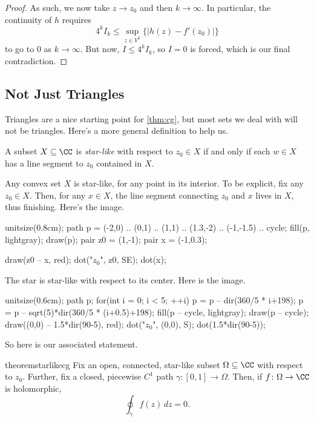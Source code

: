 \documentclass[../notes.tex]{subfiles}
\begin{document}
\begin{proof}
	As such, we now take $z\to z_0$ and then $k\to\infty$. In particular, the continuity of $h$ requires
	\[4^kI_k\le\sup_{z\in V^k}\{|h(z)-f'(z_0)|\}\]
	to go to $0$ as $k\to\infty$. But now, $I\le 4^kI_k$, so $I=0$ is forced, which is our final contradiction.
\end{proof}

\subsection{Not Just Triangles}
Triangles are a nice starting point for \autoref{thm:cg}, but most sets we deal with will not be triangles. Here's a more general definition to help us.
\begin{definition}
	A subset $X\subseteq\CC$ is \textit{star-like} with respect to $z_0\in X$ if and only if each $w\in X$ has a line segment to $z_0$ contained in $X$.
\end{definition}
\begin{example}
	Any convex set $X$ is star-like, for any point in its interior. To be explicit, fix any $z_0\in X$. Then, for any $x\in X$, the line segment connecting $z_0$ and $x$ lives in $X$, thus finishing. Here's the image.
	\begin{center}
		\begin{asy}
			unitsize(0.8cm);
			path p = (-2,0) .. (0,1) .. (1,1) .. (1.3,-2) .. (-1,-1.5) .. cycle;
			fill(p, lightgray);
			draw(p);
			pair z0 = (1,-1);
			pair x = (-1,0.3);

			draw(z0 -- x, red);
			dot("$z_0$", z0, SE);
			dot(x);
		\end{asy}
	\end{center}
\end{example}
\begin{ex}
	The star is star-like with respect to its center. Here is the image.
	\begin{center}
		\begin{asy}
			unitsize(0.6cm);
			path p;
			for(int i = 0; i < 5; ++i)
			{
				p = p -- dir(360/5 * i+198);
				p = p -- sqrt(5)*dir(360/5 * (i+0.5)+198);
			}
			fill(p -- cycle, lightgray);
			draw(p -- cycle);
			draw((0,0) -- 1.5*dir(90-5), red);
			dot("$z_0$", (0,0), S);
			dot(1.5*dir(90-5));
		\end{asy}
	\end{center}
\end{ex}
So here is our associated statement.
\begin{restatable}{theorem}{starlikecg} \label{thm:starlikecg}
	Fix an open, connected, star-like subset $\Omega\subseteq\CC$ with respect to $z_0$. Further, fix a closed, piecewise $C^1$ path $\gamma\colon [0,1]\to\Omega$. Then, if $f\colon \Omega\to\CC$ is holomorphic,
	\[\oint_\gamma f(z)\,dz=0.\]
\end{restatable}
\end{document}
